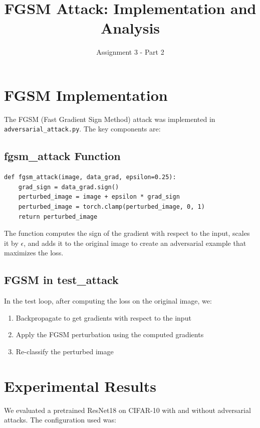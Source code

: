 \documentclass[11pt]{article}
\title{FGSM Attack: Implementation and Analysis}
\author{Assignment 3 - Part 2}
\date{}
\begin{document}
\maketitle

\section{FGSM Implementation}

The FGSM (Fast Gradient Sign Method) attack was implemented in \texttt{adversarial\_attack.py}. The key components are:

\subsection{fgsm\_attack Function}
\begin{verbatim}
def fgsm_attack(image, data_grad, epsilon=0.25):
    grad_sign = data_grad.sign()
    perturbed_image = image + epsilon * grad_sign
    perturbed_image = torch.clamp(perturbed_image, 0, 1)
    return perturbed_image
\end{verbatim}

The function computes the sign of the gradient with respect to the input, scales it by $\epsilon$, and adds it to the original image to create an adversarial example that maximizes the loss.

\subsection{FGSM in test\_attack}
In the test loop, after computing the loss on the original image, we:
\begin{enumerate}
    \item Backpropagate to get gradients with respect to the input
    \item Apply the FGSM perturbation using the computed gradients
    \item Re-classify the perturbed image
\end{enumerate}

\section{Experimental Results}

We evaluated a pretrained ResNet18 on CIFAR-10 with and without adversarial attacks. The configuration used was:
\end{document}
